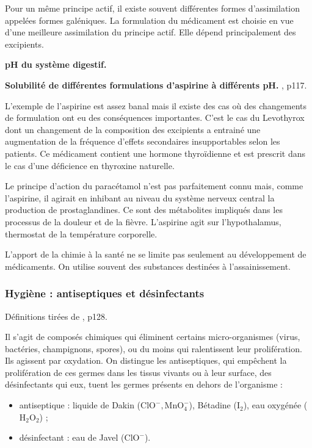 Pour un même principe actif, il existe souvent différentes formes d'assimilation appelées formes galéniques.
La formulation du médicament est choisie en vue d'une meilleure assimilation du principe actif.
Elle dépend principalement des excipients.

\begin{slide}
\textbf{pH du système digestif.}
\end{slide}

\begin{experience}
\textbf{Solubilité de différentes formulations d'aspirine à différents pH.}
\cite{Bataille2010}, p117.
\end{experience}

L'exemple de l'aspirine est assez banal mais il existe des cas où des changements de formulation ont eu des conséquences importantes.
C'est le cas du Levothyrox \cite{Levothyrox} dont un changement de la composition des excipients a entrainé une augmentation de la fréquence d'effets secondaires insupportables selon les patients.
Ce médicament contient une hormone thyroïdienne et est prescrit dans le cas d'une déficience en thyroxine naturelle.

\begin{remarque}
Le principe d'action du paracétamol n'est pas parfaitement connu mais, comme l'aspirine, il agirait en inhibant au niveau du système nerveux central la production de prostaglandines.
Ce sont des métabolites impliqués dans les processus de la douleur et de la fièvre.
L'aspirine agit sur l'hypothalamus, thermostat de la température corporelle.
\end{remarque}

\begin{transition}
L'apport de la chimie à la santé ne se limite pas seulement au développement de médicaments.
On utilise souvent des substances destinées à l'assainissement.
\end{transition}

\subsubsection{Hygiène : antiseptiques et désinfectants}

Définitions tirées de \cite{Azan2011}, p128.

Il s'agit de composés chimiques qui éliminent certains micro-organismes (virus, bactéries, champignons, spores), ou du moins qui ralentissent leur prolifération.
Ils agissent par oxydation.
On distingue les antiseptiques, qui empêchent la prolifération de ces germes dans les tissus vivants ou à leur surface, des désinfectants qui eux, tuent les germes présents en dehors de l'organisme :
\begin{itemize}
\item antiseptique : liquide de Dakin ($\mathrm{ClO^-, MnO_4^-}$), Bétadine ($\mathrm{I_2}$), eau oxygénée ($\mathrm{H_2O_2}$) ;
\item désinfectant : eau de Javel ($\mathrm{ClO^-}$).
\end{itemize}

